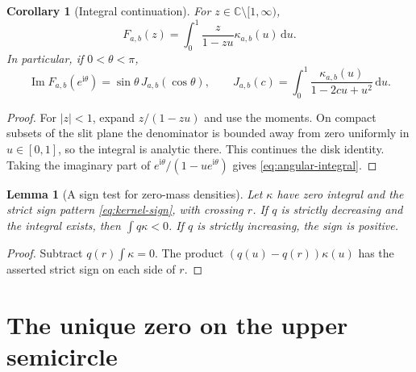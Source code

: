\documentclass[11pt,a4paper]{article}
\numberwithin{equation}{section}
\newtheorem{lemma}[theorem]{Lemma}
\newtheorem{corollary}[theorem]{Corollary}
\theoremstyle{definition}
\theoremstyle{remark}
\newcommand{\Imag}{\operatorname{Im}}
\newcommand{\dd}{\,\mathrm{d}}
\newcommand{\ii}{\mathrm{i}}
\begin{document}
\begin{corollary}[Integral continuation]\label{cor:stieltjes}
For $z\in\mathbb C\setminus[1,\infty)$,
\begin{equation}\label{eq:stieltjes}
 F_{a,b}(z)=\int_0^1\frac{z}{1-zu}\kappa_{a,b}(u)\dd u.
\end{equation}
In particular, if $0<\theta<\pi$,
\begin{equation}\label{eq:angular-integral}
 \Imag F_{a,b}(e^{\ii\theta})
 =\sin\theta\,J_{a,b}(\cos\theta),\qquad
 J_{a,b}(c)=\int_0^1\frac{\kappa_{a,b}(u)}{1-2cu+u^2}\dd u.
\end{equation}
\end{corollary}
\begin{proof}
For $|z|<1$, expand $z/(1-zu)$ and use the moments. On compact subsets of the slit plane the denominator is bounded away from zero uniformly in $u\in[0,1]$, so the integral is analytic there. This continues the disk identity. Taking the imaginary part of $e^{\ii\theta}/(1-ue^{\ii\theta})$ gives \eqref{eq:angular-integral}.
\end{proof}

\begin{lemma}[A sign test for zero-mass densities]\label{lem:sign-test}
Let $\kappa$ have zero integral and the strict sign pattern \eqref{eq:kernel-sign}, with crossing $r$. If $q$ is strictly decreasing and the integral exists, then $\int q\kappa<0$. If $q$ is strictly increasing, the sign is positive.
\end{lemma}
\begin{proof}
Subtract $q(r)\int\kappa=0$. The product $(q(u)-q(r))\kappa(u)$ has the asserted strict sign on each side of $r$.
\end{proof}

\section{The unique zero on the upper semicircle}
\label{sec:zeros}
\end{document}
